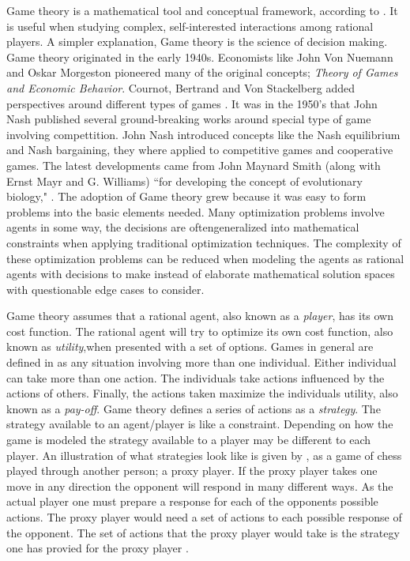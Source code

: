 \documentclass[phd, 12pt, print]{fauthesis}
\begin{document}
Game theory is a mathematical tool and conceptual framework, according to \cite{Mediwaththe}.
It is useful when studying complex, self-interested interactions among rational players. 
A simpler explanation, Game theory is the science of decision making. Game theory originated 
in the early 1940s. Economists like John Von Nuemann and Oskar Morgeston pioneered many 
of the original concepts; \textit{Theory of  Games  and  Economic  Behavior}\cite{Neumann}. Cournot, Bertrand and 
Von Stackelberg added perspectives around different types of games \cite{Azad}. It was in the 
1950's that John Nash published several ground-breaking works around special type of game involving 
compettition. John Nash introduced concepts like the Nash equilibrium and Nash bargaining, 
they where applied to competitive games and cooperative games. The latest developments came from 
John Maynard Smith (along with Ernst Mayr and G. Williams) “for developing  the  concept  of  evolutionary  biology,"
\cite{Smith1,Smith2,Smith3}. The adoption of Game theory grew because it was easy to form 
problems into the basic elements needed. Many optimization problems involve agents in some way, 
the decisions are oftengeneralized into mathematical constraints when applying traditional optimization techniques.
The complexity of these optimization problems can be reduced when modeling the agents as rational
agents with decisions to make instead of elaborate mathematical solution spaces with questionable 
edge cases to consider. 

Game theory assumes that a rational agent, also known as a \textit{player}, has its own 
cost function. The rational agent will try to optimize its own cost function, also known 
as \textit{utility},when presented with a set of options. Games in general are defined in 
\cite{McEachern} as any situation involving more than one individual. Either individual can take more 
than one action. The individuals take actions influenced by the actions of others. Finally, the 
actions taken maximize the individuals utility, also known as a \textit{pay-off}. Game theory 
defines a series of actions as a \textit{strategy}. The strategy available to an agent/player 
is like a constraint. Depending on how the game is modeled the strategy available to a player 
may be different to each player. An illustration of what strategies look like is given by \cite{Azad}, 
as a game of chess played through another person; a proxy player. If the proxy player takes 
one move in any direction the opponent will respond in many different ways. As the actual player
one must prepare a response for each of the opponents possible actions. The proxy player would 
need a set of actions to each possible response of the opponent. The set of actions that the 
proxy player would take is the strategy one has provied for the proxy player \cite{Girshick}.
\end{document}
